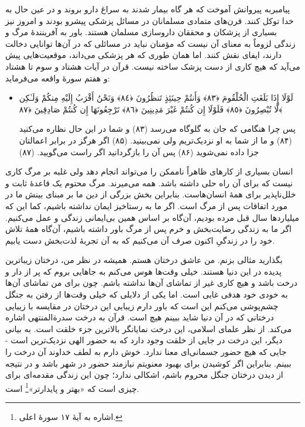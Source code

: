 پیامبر{}به پیروانش آموخت که هر گاه بیمار شدند به سراغ دارو بروند و در عین حال به خدا توکل کنند. قرن‌های متمادی مسلمانان در مسائل پزشکی پیشرو بودند و امروز نیز بسیاری از پزشکان و محققان داروسازی مسلمان هستند. باور به آفرینندهٔ مرگ و زندگی لزوماً به معنای آن نیست که مؤمنان نباید در مسائلی که در آن‌ها توانایی دخالت دارند، ایفای نقش کنند. اما همان طوری که هر پزشکی می‌داند، موقعیت‌هایی پیش می‌آید که هیچ کاری از دست پزشک ساخته نیست. قرآن در آیات هشتاد و سوم تا هشتاد و هفتم سورهٔ واقعه می‌فرماید:
\begin{itemize}
	\item[]
	{
		لَوْلَا إِذَا بَلَغَتِ الْحُلْقُومَ ﴿٨٣﴾ وَأَنتُمْ حِينَئِذٍ تَنظُرُونَ ﴿٨٤﴾ وَنَحْنُ أَقْرَبُ إِلَيْهِ مِنكُمْ وَلَـٰكِن لَّا تُبْصِرُونَ ﴿٨٥﴾ فَلَوْلَا إِن كُنتُمْ غَيْرَ مَدِينِينَ ﴿٨٦﴾ تَرْجِعُونَهَا إِن كُنتُمْ صَادِقِينَ ﴿٨٧﴾}
	
	{
		پس چرا هنگامی که جان به گلوگاه می‌رسد (۸۳) و شما در این حال نظاره می‌کنید (۸۴) و ما از شما به او نزدیک‌تریم ولی نمی‌بینید. (۸۵) اگر هرگز در برابر اعمالتان جزا داده نمی‌شوید (۸۶) پس آن  را بازگردانید اگر راست می‌گویید. (۸۷)}
\end{itemize}


انسان بسیاری از کارهای ظاهراً ناممکن را می‌تواند انجام دهد ولی غلبه بر مرگ کاری نیست که  برای آن راه حلی داشته باشد. همه می‌میرند. مرگ محتوم یک قاعدهٔ ثابت و خلل‌ناپذیر برای همهٔ انسان‌هاست. بنابراین بخش بزرگی از دین ما بر مبنای بینش ما در مورد اتفاقات پس از مرگ است. اگر ما به رستاخیز ایمان نداشته باشیم، کما این که میلیاردها سال قبل مرده بودیم، آن‌گاه بر اساس همین بی‌ایمانی زندگی و عمل می‌کنیم. اگر ما به زندگی رضایت‌بخش و خرم پس از مرگ باور داشته باشیم، آن‌گاه همهٔ تلاش خود را در زندگیِ اکنون صرف آن می‌کنیم که به آن تجربهٔ لذت‌بخش دست یابیم.

بگذارید مثالی بزنم. من عاشق درختان هستم. همیشه در نظر من، درختان زیباترین پدیده در این دنیا هستند. خیلی وقت‌ها هوس می‌کنم به جاهایی بروم که پر از دار و درخت باشد و هیچ کاری غیر از تماشای آن‌ها نداشته باشم. چون برای من تماشای آن‌ها به خودی خود هدفی غایی است. اما یکی از دلایلی که خیلی وقت‌ها از رفتن به جنگل چشم‌پوشی می‌کنم این است که باور دارم زیبایی این درختان در مقایسه با زیبایی درختانی که در آن دنیا شاید ببینم هیچ است. قرآن به درخت سدرةالمنتهی اشاره می‌کند. از نظر علمای اسلامی، این درخت نمایانگر بالاترین جزء خلقت است. به بیانی دیگر، این درخت در جایی از خلقت وجود دارد که به حضور الهی نزدیک‌ترین است - جایی که هیچ حضور جسمانی‌ای معنا ندارد. خوش دارم به لطف خداوند آن درخت را ببینم. بنابراین اگر کوشیدن برای بهبود معنویتم نیازمند حضور در شهر باشد و در نتیجه از دیدن درختان جنگل محروم باشم، اشکالی ندارد؛ چون این زندگی مقدمه‌ای برای چیزی است که «بهتر و پایدارتر»\footnote{اشاره به آیهٔ ۱۷ سورهٔ اعلی.} است.

